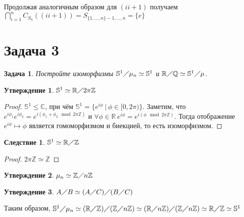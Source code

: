 \documentclass{article}
\newtheorem{task}{Задача}
\newtheorem{cq}{Следствие}
\newtheorem{statement}{Утверждение}
\newcommand{\srange}[2]{\{#1, \dots, #2\}}
\newcommand{\range}[2]{#1, \dots, #2}
\newcommand{\subgroup}{\leq}
\newcommand{\isomorphic}{\simeq}
\newcommand{\sphere}[1]{\mathbb{S}^{#1}}
\newcommand{\quotient}[2]{#1 \diagup #2}
\newcommand{\R}{\mathbb{R}}
\newcommand{\Q}{\mathbb{Q}}
\newcommand{\Z}{\mathbb{Z}}
\newcommand{\Zn}[1]{\quotient{\Z}{#1\Z}}
\newcommand{\Complex}{\mathbb{C}}
\begin{document}
Продолжая аналогичным образом для $(i i+1)$ получаем $\bigcap_{i = 1}^{n}C_{S_n}((i i+1)) = S_{\srange{1}{n} - \range{1}{n}} = \{e\}$

\section*{Задача 3}

\begin{task}
    Постройте изоморфизмы 
    $\quotient{\sphere{1}}{\mu_n} \isomorphic \sphere{1}$ и 
    $\quotient{\R}{\Q} \isomorphic \quotient{\sphere{1}}{\mu}$.
\end{task}

\begin{statement}
$\sphere{1} \isomorphic \quotient{\R}{2\pi\Z}$
\end{statement}

\begin{proof}
$\sphere{1} \subgroup \Complex$, при чём 
$\sphere{1} = \{ e^{i \phi} ~ | ~ \phi \in [0, 2 \pi)\}$.
Заметим, что $e^{i \phi_1} e^{i \phi_2} = e^{i(\phi_1 + \phi_2 \mod{2\pi\Z})}$ и
$ \forall \phi \in \R ~ e^{i \phi} = e^{i (\phi \mod{2\pi\Z})}$.
Тогда отображение $e^{i \phi} \mapsto \phi$ является гомоморфизмом и биекцией, то
есть изоморфизмом. 
\end{proof}

\begin{cq}
\label{sec3:sphere}
$\sphere{1} \isomorphic \quotient{\R}{\Z}$
\end{cq}

\begin{proof}
$2 \pi \Z \isomorphic \Z$
\end{proof}

\begin{statement}
$\mu_n \isomorphic \Zn{n}$
\end{statement}

\begin{statement}
$\quotient{A}{B} \isomorphic \quotient{(\quotient{A}{C})}{(\quotient{B}{C})}$
\end{statement}

Таким образом, 
\begin{math}
    \quotient{\sphere{1}}{\mu_n}                \isomorphic 
    \quotient{(\quotient{\R}{\Z})}{(\Zn{n})}    \isomorphic 
    \quotient{(\quotient{\R}{n\Z})}{(\Zn{n})}   \isomorphic 
    \quotient{\R}{\Z}                           \isomorphic 
    \sphere{1}
\end{math}
\end{document}
